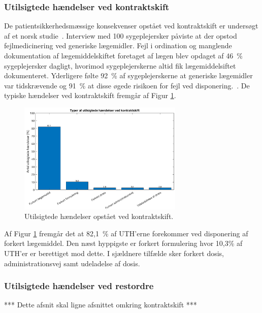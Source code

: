 \subsubsection{Utilsigtede hændelser ved kontraktskift}
De patientsikkerhedsmæssige konsekvenser opstået ved kontraktskift er undersøgt af et norsk studie~\citep{Hakonsen2010}. Interview med 100 sygeplejersker påviste at der opstod fejlmedicinering ved generiske lægemidler. Fejl i ordination og manglende dokumentation af lægemiddelskiftet foretaget af lægen blev opdaget af 46~\% sygeplejersker dagligt, hvorimod sygeplejerskerne altid fik lægemiddelsiftet dokumenteret. Yderligere følte 92~\% af sygeplejerskerne at generiske lægemidler var tidskrævende og 91~\% at disse øgede risikoen for fejl ved disponering.~\citep{Hakonsen2010}. De typiske hændelser ved kontraktskift fremgår af Figur \ref{fig:UTHkontraktskift}.

\begin{figure}[H]\centering
	\includegraphics[width=0.7\textwidth]{billeder/UTH1.png} 
	\caption{Utilsigtede hændelser opstået ved kontraktskift\citep{Hakonsen2010}.}
	\label{fig:UTHkontraktskift}  
\end{figure}

Af Figur \ref{fig:UTHkontraktskift} fremgår det at 82,1~\% af UTH'erne forekommer ved disponering af forkert lægemiddel. Den næst hyppigste er forkert formulering hvor 10,3\% af UTH'er er berettiget mod dette. I  sjældnere tilfælde sker forkert dosis, administrationsvej samt udeladelse af dosis. 




\subsubsection{Utilsigtede hændelser ved restordre}
***  Dette afsnit skal ligne afsnittet omkring kontraktskift ***

%
%


